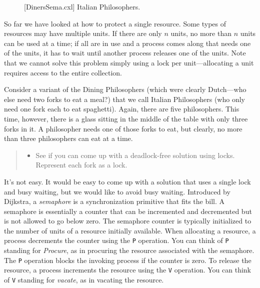 \documentclass{report}
\newenvironment{code}{
\tcolorbox
}{
\endtcolorbox
}
\begin{document}
\begin{figure}
\begin{code}
\end{code}
\caption{[DinersSema.cxl] Italian Philosophers.}
\label{fig:dinerssema}
\end{figure}

So far we have looked at how to protect a single resource.
Some types of resources may have multiple units.
If there are only $n$ units, no more than $n$ units can be used at a time;
if all are in use and a process comes along that needs one of the units,
it has to wait until another process releases one of the units.
Note that we cannot solve this problem simply using a lock per unit---allocating
a unit requires access to the entire collection.

Consider a variant of the Dining Philosophers (which were clearly Dutch---who
else need two forks to eat a meal?) that we call Italian Philosophers (who only
need one fork each to eat spaghetti).  Again, there are five philosophers.
This time, however, there is a glass sitting in the middle of the table with only
three forks in it.  A philosopher needs one of those forks to eat, but clearly,
no more than three philosophers can eat at a time.

\begin{quote}
\begin{itemize}
\item See if you can come up with a deadlock-free solution using locks.  Represent
    each fork as a lock.
\end{itemize}
\end{quote}

It's not easy.  It would be easy to come up with a solution that uses a single lock
and busy waiting, but we would like to avoid busy waiting.
Introduced by Dijkstra,
a \emph{semaphore} is a synchronization primitive that fits the bill.
A semaphore is essentially
a counter that can be incremented and decremented but is not allowed to go
below zero.  The semaphore counter is typically initialized to the number of
units of a resource initially available.
When allocating a resource, a process decrements the
counter using the \texttt{P} operation.  You can think of \texttt{P} standing
for \emph{Procure}, as in procuring the resource associated with the semaphore.
The \texttt{P} operation blocks the invoking process if the counter is zero.
To release the resource, a process increments the resource using the
\texttt{V} operation.  You can think of \texttt{V} standing for \emph{vacate},
as in vacating the resource.
\end{document}
